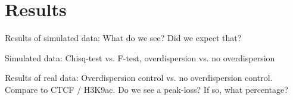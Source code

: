 \section{Results}

Results of simulated data: What do we see? Did we expect that?

Simulated data: Chisq-test vs. F-test, overdispersion vs. no overdispersion


Results of real data: Overdispersion control vs. no overdispersion control.
Compare to CTCF / H3K9ac. Do we see a peak-loss? If so, what percentage?
  